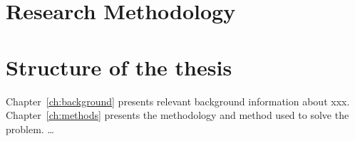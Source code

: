 
\section{Research Methodology}



\section{Structure of the thesis}


Chapter~\ref{ch:background} presents relevant background information about xxx.  Chapter~\ref{ch:methods} presents the methodology and method used to solve the problem. …

\cleardoublepage


